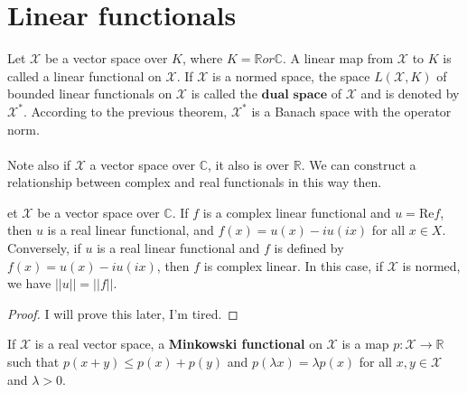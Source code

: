 \documentclass[12pt]{article}
\newcommand{\R}{\mathbb{R}}
\newcommand{\C}{\mathbb{C}}
\newcommand{\X}{\mathcal{X}}
\newenvironment{theorem}[2][Theorem]{\begin{trivlist}
\item[\hskip \labelsep {\bfseries #1}\hskip \labelsep {\bfseries #2.}]}{\end{trivlist}}
\newenvironment{definition}[2][Definition]{\begin{trivlist}
\item[\hskip \labelsep {\bfseries #1}\hskip \labelsep {\bfseries #2.}]}{\end{trivlist}}
\begin{document}
\section{Linear functionals}
Let $\X$ be a vector space over $K$, where $K = \R or \C$. A linear map from $\X$ to $K$ is called a linear functional on $\X$. If $\X$ is a normed space, the space $L(\X, K)$ of bounded linear functionals on $\X$ is called the $\textbf{dual space}$ of $\X$ and is denoted by $\X^*$. According to the previous theorem, $\X^*$ is a Banach space with the operator norm. 
\\ \\
Note also if $\X$ a vector space over $\C$, it also is over $\R$. We can construct a relationship between complex and real functionals in this way then. 
\begin{theorem}
    Let $\X$ be a vector space over $\C$. If $f$ is a complex linear functional and $u = \text{Re}f$, then $u$ is a real linear functional, and $f(x) = u(x) - iu(ix)$ for all $x \in X$. Conversely, if $u$ is a real linear functional and $f$ is defined by $f(x) = u(x) - iu(ix)$, then $f$ is complex linear. In this case, if $\X$ is normed, we have $||u|| = ||f||$. 
    \begin{proof}
        I will prove this later, I'm tired.
    \end{proof}
\end{theorem}

\begin{definition}{(Minkowski functional)}
    If $\X$ is a real vector space, a \textbf{Minkowski functional} on $\X$ is a map $p : \X \rightarrow \R$ such that $p(x + y) \leq p(x) + p(y)$ and $p(\lambda x) = \lambda p(x)$ for all $x, y \in \X$ and $\lambda > 0$. 
\end{definition}
\end{document}
